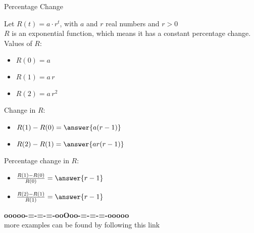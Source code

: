 \documentclass{ximera}
\begin{document}
\begin{example} Percentage Change



Let $R(t) = a \cdot r^t$, with $a$ and $r$ real numbers and $r>0$ \\

$R$ is an exponential function, which means it has a constant percentage change. \\

Values of $R$:

\begin{itemize}
\item $R(0) = a$

\item $R(1) = a \, r$

\item $R(2) = a \, r^2$
\end{itemize}



Change in $R$:

\begin{itemize}
\item $R(1) - R(0) = \answer{a (r-1)}$

\item $R(2) - R(1) = \answer{a r (r-1)}$

\end{itemize}





Percentage change in $R$:

\begin{itemize}
\item $\frac{R(1) - R(0)}{R(0)} = \answer{r-1}$

\item $\frac{R(2) - R(1)}{R(1)} = \answer{r-1}$

\end{itemize}


\end{example}













\begin{center}
\textbf{\textcolor{green!50!black}{ooooo-=-=-=-ooOoo-=-=-=-ooooo}} \\

more examples can be found by following this link\\ 

\end{center}
\end{document}
